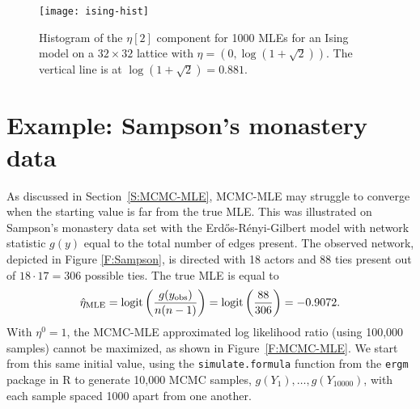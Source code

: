 \begin{figure}[h!]
\begin{center}
\texttt{[image: ising-hist]}
\end{center}
\caption[Histogram of the $\eta 2$ component for 1000 MLEs for an Ising model on a $32 \times 32$ lattice with $\eta$ at phase transition value.]
{Histogram of the $\eta[2]$ component for 1000 MLEs for 
an Ising model on a $32 \times 32$ lattice with $\eta = \left(0, \log(1 + \sqrt{2}) 
\right)$.  The vertical line is at $\log(1 + \sqrt{2}) = 0.881$. }
\label{F:ising-hist}
\end{figure}

%
%
%

\section{Example: Sampson's monastery data} \label{S:Example:Sampson}
As discussed in Section~\ref{S:MCMC-MLE}, MCMC-MLE may struggle to converge when the 
starting value is far from the true MLE.  This was illustrated on Sampson's monastery data set with the Erd\H{o}s-R\'{e}nyi-Gilbert model with network statistic $g(y)$ equal to 
the total number of edges present.
The observed network, depicted in Figure \ref{F:Sampson}, is directed with 18 actors and 
88 ties present out of $18 \cdot 17=306$ possible ties.  The true MLE is equal to 
\begin{align*}
	\hat{\eta}_{\textrm{MLE}} = \operatorname{logit}\left( \frac{g(y_{\text{obs}})}{n(n-1)}\right) = \operatorname{logit} \left( \frac{88}{306}\right ) = -0.9072.
\end{align*}
With $\eta^0 = 1$, the MCMC-MLE approximated log likelihood ratio (using 100,000 samples) 
cannot be maximized, as shown in Figure~\ref{F:MCMC-MLE}.
We start from this same initial value, using the \texttt{simulate.formula} function
from the \texttt{ergm} package in R to generate 10,000 MCMC samples, $g(Y_1), \ldots, g(Y_
{10000})$, with each sample spaced 1000 apart from one another.

